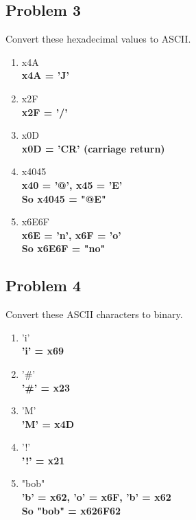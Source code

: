 \documentclass{article}
\begin{document}
\subsection*{Problem 3}
Convert these hexadecimal values to ASCII.
\begin{enumerate}[label=\alph*.]
    \item x4A\\
    \textbf{x4A = 'J'}
    \item x2F\\
    \textbf{x2F = '/'}
    \item x0D\\
    \textbf{x0D = 'CR' (carriage return)}
    \item x4045\\
    \textbf{x40 = '@', x45 = 'E'\\
            So x4045 = "@E"}
    \item x6E6F\\
    \textbf{x6E = 'n', x6F = 'o'\\
            So x6E6F = "no"}
\end{enumerate}

\subsection*{Problem 4}
Convert these ASCII characters to binary.
\begin{enumerate}[label=\alph*.]
    \item 'i'\\
    \textbf{'i' = x69}
    \item '\#'\\
    \textbf{'\#' = x23}
    \item 'M'\\
    \textbf{'M' = x4D}
    \item '!'\\
    \textbf{'!' = x21}
    \item "bob"\\
    \textbf{'b' = x62, 'o' = x6F, 'b' = x62\\
            So "bob" = x626F62}
\end{enumerate}
\end{document}
